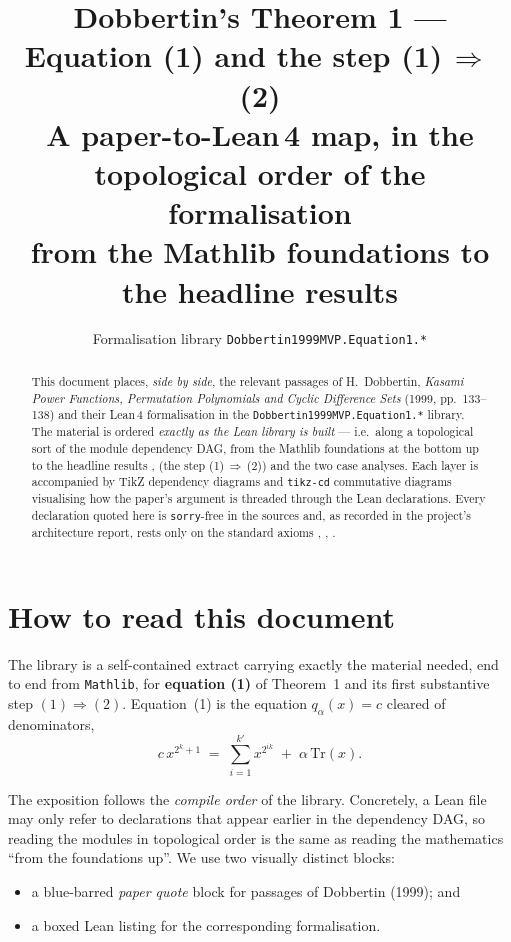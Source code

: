 \documentclass[11pt]{article}
\title{\textbf{Dobbertin's Theorem 1 --- Equation (1) and the step (1)\,$\Rightarrow$\,(2)}\\[4pt]
\large A paper-to-Lean\,4 map, in the topological order of the formalisation\\[2pt]
\normalsize from the Mathlib foundations to the headline results}
\author{Formalisation library \texttt{Dobbertin1999MVP.Equation1.*}}
\date{}
\theoremstyle{definition}
\begin{document}
\maketitle

\begin{abstract}
\noindent
This document places, \emph{side by side}, the relevant passages of
H.~Dobbertin, \emph{Kasami Power Functions, Permutation Polynomials and Cyclic
Difference Sets} (1999, pp.~133--138) and their Lean\,4 formalisation in the
\texttt{Dobbertin1999MVP.Equation1.*} library.  The material is ordered
\emph{exactly as the Lean library is built} --- i.e.\ along a topological sort
of the module dependency DAG, from the Mathlib foundations at the bottom up to
the headline results ,  (the step (1)\,$\Rightarrow$\,(2))
and the two case analyses.  Each layer is accompanied by TikZ dependency
diagrams and \texttt{tikz-cd} commutative diagrams visualising how the paper's
argument is threaded through the Lean declarations.  Every declaration quoted
here is \texttt{sorry}-free in the sources and, as recorded in the project's
architecture report, rests only on the standard axioms ,
, .
\end{abstract}

\tableofcontents
\bigskip

\section{How to read this document}

The library is a self-contained extract carrying exactly the material needed,
end to end from \texttt{Mathlib}, for \textbf{equation (1)} of Theorem~1 and its
first substantive step $(1)\Rightarrow(2)$.  Equation~(1) is the equation
$q_\alpha(x)=c$ cleared of denominators,
\[
   c\,x^{2^k+1} \;=\; \sum_{i=1}^{k'} x^{2^{ik}} \;+\; \alpha\,\mathrm{Tr}(x).
   \tag{1}
\]

The exposition follows the \emph{compile order} of the library.  Concretely, a
Lean file may only refer to declarations that appear earlier in the dependency
DAG, so reading the modules in topological order is the same as reading the
mathematics ``from the foundations up''.  We use two visually distinct blocks:

\begin{itemize}[nosep]
  \item a blue-barred \emph{paper quote} block for passages of Dobbertin (1999); and
  \item a boxed Lean listing for the corresponding formalisation.
\end{itemize}
\end{document}

